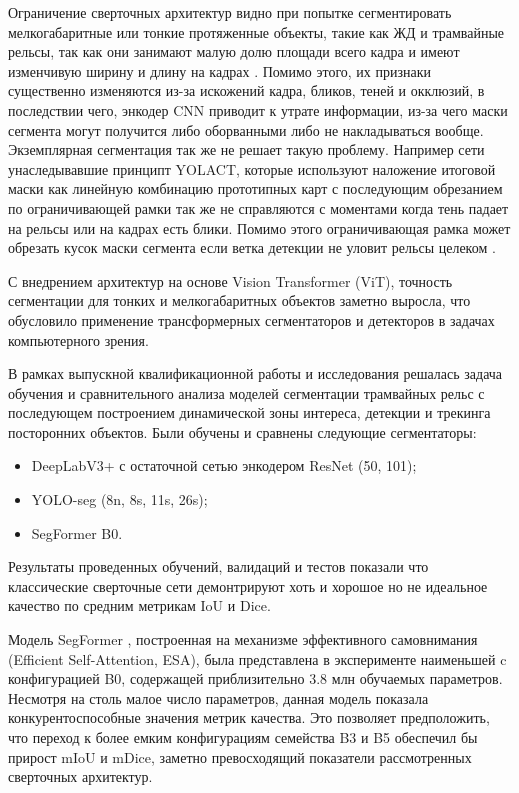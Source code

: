 \documentclass[areasetadvanced]{scrartcl}
\begin{document}
	Ограничение сверточных архитектур видно при попытке сегментировать мелкогабаритные или тонкие протяженные объекты, такие как
	ЖД и трамвайные рельсы, так как они занимают малую долю площади всего кадра и имеют изменчивую ширину и длину на кадрах \cite{myarticle}. Помимо этого, 
	их признаки существенно изменяются из-за искожений кадра, бликов, теней и окклюзий, в последствии чего, энкодер CNN приводит к утрате информации, из-за 
	чего маски сегмента могут получится либо оборванными либо не накладываться вообще. 
	Экземплярная сегментация так же не решает такую проблему. Например сети унаследывавшие принципт YOLACT, которые используют наложение итоговой маски как линейную 
	комбинацию прототипных карт с последующим обрезанием по ограничивающей рамки так же не справляются с моментами когда тень падает на рельсы или на кадрах есть блики. 
	Помимо этого ограничивающая рамка может обрезать кусок маски сегмента если ветка детекции не уловит рельсы целеком \cite{myarticle}. 

	С внедрением архитектур на основе Vision Transformer (ViT), точность сегментации для тонких и мелкогабаритных объектов заметно выросла, что обусловило 
	применение трансформерных сегментаторов и детекторов в задачах компьютерного зрения. 

	В рамках выпускной квалификационной работы и исследования решалась задача обучения и сравнительного анализа моделей сегментации трамвайных рельс с последующем построением 
	динамической зоны интереса, детекции и трекинга посторонних объектов. Были обучены и сравнены следующие сегментаторы: 
	\begin{itemize}
		\item DeepLabV3+ с остаточной сетью энкодером ResNet (50, 101);
		\item YOLO-seg (8n, 8s, 11s, 26s);
		\item SegFormer B0.
	\end{itemize}

	Результаты проведенных обучений, валидаций и тестов показали что классические сверточные сети демонтрируют хоть и хорошое но не идеальное качество по средним метрикам IoU и Dice.
	
	Модель SegFormer \cite{segformer}, построенная на механизме эффективного самовнимания
	(Efficient Self-Attention, ESA), была представлена в эксперименте наименьшей c конфигурацией
	B0, содержащей приблизительно 3.8 млн обучаемых параметров. Несмотря на столь
	малое число параметров, данная модель показала конкурентоспособные значения
	метрик качества. Это позволяет предположить, что переход к более емким конфигурациям семейства B3 и B5 обеспечил бы прирост mIoU и mDice, 
	заметно превосходящий показатели рассмотренных сверточных архитектур.
\end{document}
